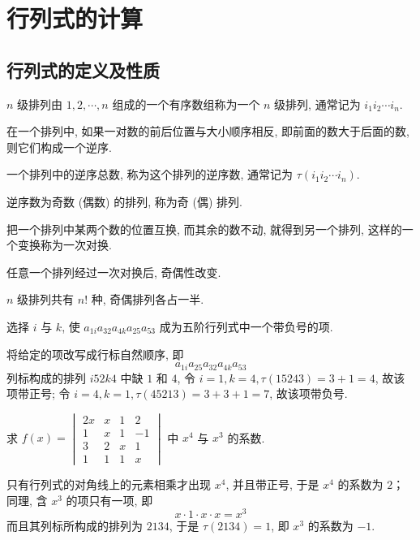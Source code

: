 \section{行列式的计算}

\subsection{行列式的定义及性质}

\begin{definition}
    $n $ 级排列由 $ 1,2, \cdots, n $ 组成的一个有序数组称为一个 $ n $ 级排列, 通常记为 $ i_{1} i_{2} \cdots i_{n} $.
\end{definition}
\begin{definition}
    在一个排列中, 如果一对数的前后位置与大小顺序相反, 即前面的数大于后面的数, 则它们构成一个逆序.
\end{definition}
\begin{definition}
    一个排列中的逆序总数, 称为这个排列的逆序数, 通常记为 $ \tau\left(i_{1} i_{2} \cdots i_{n}\right) $.
\end{definition}
\begin{definition}
    逆序数为奇数 (偶数) 的排列, 称为奇 (偶) 排列.
\end{definition}
\begin{definition}
    把一个排列中某两个数的位置互换, 而其余的数不动, 就得到另一个排列, 这样的一个变换称为一次对换.
\end{definition}
\begin{theorem}
    任意一个排列经过一次对换后, 奇偶性改变.
\end{theorem}
\begin{theorem}
    $ n $ 级排列共有 $ n! $ 种, 奇偶排列各占一半.
\end{theorem}

\begin{example}
    选择 $i$ 与 $k$, 使 $a_{1i}a_{32}a_{4k}a_{25}a_{53}$ 成为五阶行列式中一个带负号的项.
\end{example}
\begin{solution}
    将给定的项改写成行标自然顺序, 即 $$a_{1i}a_{25}a_{32}a_{4k}a_{53}$$
    列标构成的排列 $i52k4$ 中缺 $1$ 和 $4$, 令 $i=1,k=4,\tau(15243)=3+1=4$, 故该项带正号;
    令 $i=4,k=1,\tau(45213)=3+3+1=7$, 故该项带负号.
\end{solution}

\begin{example}
    求 $\displaystyle f(x)=\begin{vmatrix}
            2x & x & 1 & 2  \\
            1  & x & 1 & -1 \\
            3  & 2 & x & 1  \\
            1  & 1 & 1 & x
        \end{vmatrix}$ 中 $x^4$ 与 $x^3$ 的系数.
\end{example}
\begin{solution}
    只有行列式的对角线上的元素相乘才出现 $x^4$, 并且带正号, 于是 $x^4$ 的系数为 $2$；
    同理, 含 $x^3$ 的项只有一项, 即 $$x\cdot 1\cdot x\cdot x=x^3$$
    而且其列标所构成的排列为 $2134$, 于是 $\tau(2134)=1$, 即 $x^3$ 的系数为 $-1.$
\end{solution}

